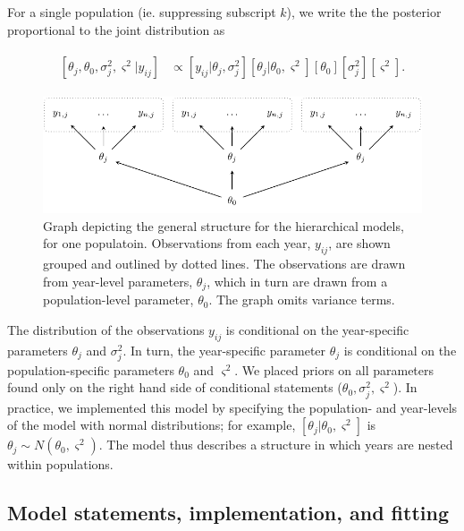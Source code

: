 \documentclass[12pt, oneside, titlepage]{article}   	%
\begin{document}
For a single population (ie. suppressing subscript $k$), we write the the posterior proportional to the joint distribution as

\begin{align}
  \begin{split}
  [ \theta_j , \theta_0 , \sigma_j^2 , \varsigma^2 | y_{ij} ] &  \propto [ y_{ij} | \theta_j , \sigma^2_j] [ \theta_j | \theta_0 , \varsigma^2 ] [ \theta_0 ] [ \sigma^2_j] [ \varsigma^2].
  \end{split}
\end{align}

\begin{figure}
       \includegraphics[scale=.65]{../manuscript/figures/dag-partialpool.pdf}  
    \caption{ Graph depicting the general structure for the hierarchical models, for one populatoin. Observations from each year, $y_{ij}$, are shown grouped and outlined by dotted lines. The observations are drawn from year-level parameters, $\theta_j$, which in turn are drawn from a population-level parameter, $\theta_0$. The graph omits variance terms. }
 \label{fig:hierarchical-dag}
\end{figure}

The distribution of the observations $y_{ij}$ is conditional on the year-specific parameters $\theta_j$ and $\sigma^2_j$. In turn, the year-specific parameter $\theta_j$ is conditional on the population-specific parameters $\theta_0$ and $ \varsigma^2$. We placed priors on all parameters found only on the right hand side of conditional statements ($\theta_0, \sigma^2_j, \varsigma^2$). In practice, we implemented this model by specifying the population- and year-levels of the model with normal distributions; for example, $[ \theta_j | \theta_0 , \varsigma^2 ]$ is $\theta_j \sim N(\theta_0, \varsigma^2)$. The model thus describes a structure in which years are nested within populations.

\subsection{Model statements, implementation, and fitting}
\end{document}

